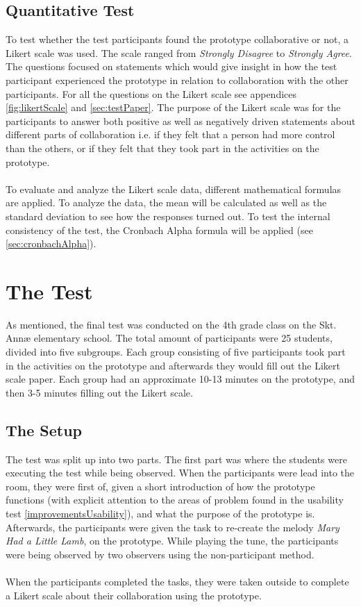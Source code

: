 \subsection{Quantitative Test}
To test whether the test participants found the prototype collaborative or not, a Likert scale was used. The scale ranged from \textit{Strongly Disagree} to \textit{Strongly Agree}. The questions focused on statements which would give insight in how the test participant experienced the prototype in relation to collaboration with the other participants. For all the questions on the Likert scale see appendices \ref{fig:likertScale} and \ref{sec:testPaper}. The purpose of the Likert scale was for the participants to answer both positive as well as negatively driven statements about different parts of collaboration i.e. if they felt that a person had more control than the others, or if they felt that they took part in the activities on the prototype.\\\\

To evaluate and analyze the Likert scale data, different mathematical formulas are applied. To analyze the data, the mean will be calculated as well as the standard deviation to see how the responses turned out. To test the internal consistency of the test, the Cronbach Alpha formula will be applied (see \autoref{sec:cronbachAlpha}).

\section{The Test}
As mentioned, the final test was conducted on the 4th grade class on the Skt. Annæ elementary school. The total amount of participants were 25 students, divided into five subgroups. Each group consisting of five participants took part in the activities on the prototype and afterwards they would fill out the Likert scale paper. Each group had an approximate 10-13 minutes on the prototype, and then 3-5 minutes filling out the Likert scale.

\subsection{The Setup} \label{setuptest}
The test was split up into two parts. The first part was where the students were executing the test while being observed. When the participants were lead into the room, they were first of, given a short introduction of how the prototype functions (with explicit attention to the areas of problem found in the usability test \autoref{improvementsUsability}), and what the purpose of the prototype is. Afterwards, the participants were given the task to re-create the melody \textit{Mary Had a Little Lamb}, on the prototype. While playing the tune, the participants were being observed by two observers using the non-participant method\cite[p.~64-67]{bjoernerBog}. \\\\
When the participants completed the tasks, they were taken outside to complete a Likert scale about their collaboration using the prototype. 

